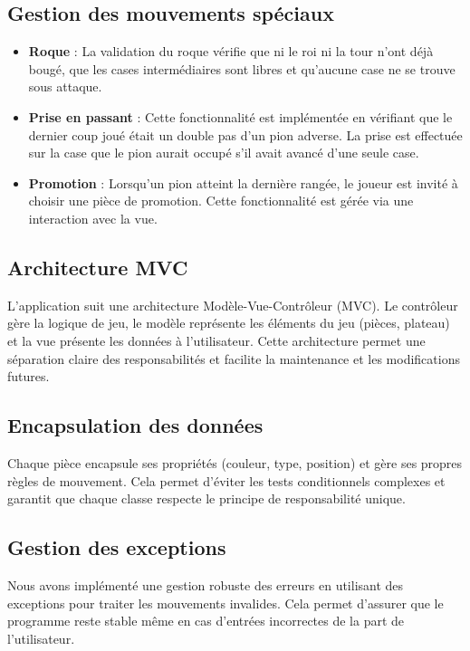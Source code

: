 \documentclass[12pt]{report}
\begin{document}
    \subsection*{Gestion des mouvements spéciaux}
    \begin{itemize}
        \item \textbf{Roque} : La validation du roque vérifie que ni le roi ni la tour n'ont déjà bougé, que les cases intermédiaires sont libres et qu'aucune case ne se trouve sous attaque.
        \item \textbf{Prise en passant} : Cette fonctionnalité est implémentée en vérifiant que le dernier coup joué était un double pas d'un pion adverse. La prise est effectuée sur la case que le pion aurait occupé s'il avait avancé d'une seule case.
        \item \textbf{Promotion} : Lorsqu'un pion atteint la dernière rangée, le joueur est invité à choisir une pièce de promotion. Cette fonctionnalité est gérée via une interaction avec la vue.
    \end{itemize}

    \subsection*{Architecture MVC}
    L'application suit une architecture Modèle-Vue-Contrôleur (MVC). Le contrôleur gère la logique de jeu, le modèle représente les éléments du jeu (pièces, plateau) et la vue présente les données à l'utilisateur. Cette architecture permet une séparation claire des responsabilités et facilite la maintenance et les modifications futures.

    \subsection*{Encapsulation des données}
    Chaque pièce encapsule ses propriétés (couleur, type, position) et gère ses propres règles de mouvement. Cela permet d'éviter les tests conditionnels complexes et garantit que chaque classe respecte le principe de responsabilité unique.

    \subsection*{Gestion des exceptions}
    Nous avons implémenté une gestion robuste des erreurs en utilisant des exceptions pour traiter les mouvements invalides. Cela permet d'assurer que le programme reste stable même en cas d'entrées incorrectes de la part de l'utilisateur.
\end{document}

